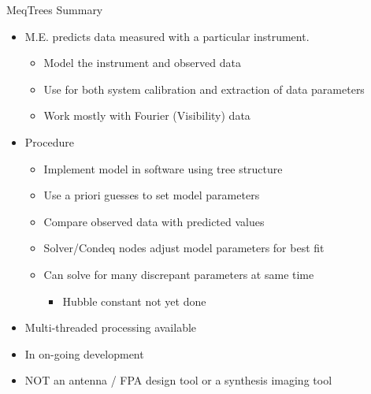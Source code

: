 \documentclass[pdf,azure,slideColor,colorBG]{prosper}
\begin{document}
\begin{slide}{MeqTrees Summary}
\begin{small}
\begin{itemize}
\item M.E. predicts data measured with a particular instrument.
\begin{itemize}
\item Model the instrument and observed data
\item Use for both system calibration and extraction of data parameters
\item Work mostly with Fourier (Visibility) data
\end{itemize}
\item Procedure
\begin{itemize}
\item Implement model in software using tree structure
\item Use a priori guesses to set model parameters
\item Compare observed data with predicted values
\item Solver/Condeq nodes adjust model parameters for best fit
\item Can solve for many discrepant parameters at same time 
\begin{itemize}
\item Hubble constant not yet done
\end{itemize}
\end{itemize}
\item Multi-threaded processing available
\item In on-going development
\item NOT an antenna / FPA design tool or a synthesis imaging tool
\end{itemize}
\end{small}
\end{slide}

\end{document}
